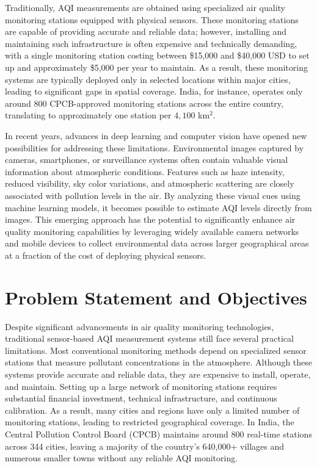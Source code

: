 \documentclass[conference]{IEEEtran}
\begin{document}
Traditionally, AQI measurements are obtained using specialized air quality
monitoring stations equipped with physical sensors. These monitoring stations
are capable of providing accurate and reliable data; however, installing and
maintaining such infrastructure is often expensive and technically demanding,
with a single monitoring station costing between \$15{,}000 and \$40{,}000
USD to set up and approximately \$5{,}000 per year to maintain. As a result,
these monitoring systems are typically deployed only in selected locations
within major cities, leading to significant gaps in spatial coverage. India,
for instance, operates only around 800 CPCB-approved monitoring stations
across the entire country, translating to approximately one station per
$4{,}100$ km$^2$.

In recent years, advances in deep learning and computer vision have opened new
possibilities for addressing these limitations. Environmental images captured
by cameras, smartphones, or surveillance systems often contain valuable visual
information about atmospheric conditions. Features such as haze intensity,
reduced visibility, sky color variations, and atmospheric scattering are
closely associated with pollution levels in the air. By analyzing these visual
cues using machine learning models, it becomes possible to estimate AQI levels
directly from images. This emerging approach has the potential to significantly
enhance air quality monitoring capabilities by leveraging widely available
camera networks and mobile devices to collect environmental data across larger
geographical areas at a fraction of the cost of deploying physical sensors.

\section{Problem Statement and Objectives}

Despite significant advancements in air quality monitoring technologies,
traditional sensor-based AQI measurement systems still face several practical
limitations. Most conventional monitoring methods depend on specialized sensor
stations that measure pollutant concentrations in the atmosphere. Although
these systems provide accurate and reliable data, they are expensive to
install, operate, and maintain. Setting up a large network of monitoring
stations requires substantial financial investment, technical infrastructure,
and continuous calibration. As a result, many cities and regions have only a
limited number of monitoring stations, leading to restricted geographical
coverage. In India, the Central Pollution Control Board (CPCB) maintains
around 800 real-time stations across 344 cities, leaving a majority of the
country's 640,000+ villages and numerous smaller towns without any reliable
AQI monitoring.
\end{document}
